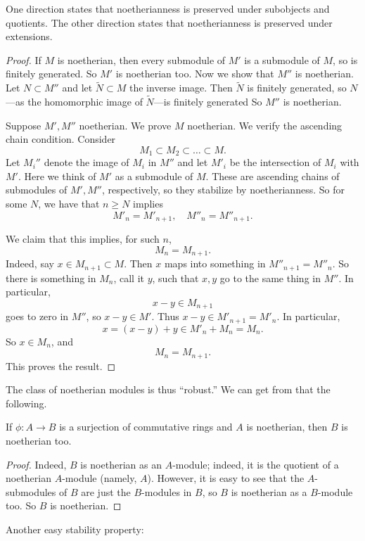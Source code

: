 One direction states that noetherianness is preserved under subobjects and
quotients. The other direction states that noetherianness is preserved under
extensions. 
\begin{proof} 
If $M$ is noetherian, then every submodule of $M'$ is a submodule of $M$, so is
finitely generated. So $M'$ is noetherian too. Now we show that $M''$ is
noetherian. Let $N \subset M''$ and let
$\widetilde{N} \subset M$ the inverse image. Then $\widetilde{N}$ is finitely generated, so
$N$---as the homomorphic image of $\widetilde{N}$---is finitely generated 
So $M''$ is noetherian.

Suppose $M', M''$ noetherian. We prove $M$ noetherian.
We verify the ascending chain condition. Consider
\[ M_1 \subset M_2 \subset \dots \subset M.  \]
Let $M_i''$ denote the image of $M_i$ in $M''$ and let $M'_i$ be the
intersection of $M_i$ with $M'$. Here we think of $M'$ as a submodule of $M$.
These are ascending chains of submodules of $M', M''$, respectively, so they
stabilize by noetherianness.
So for some $N$, we have
that $n \geq N$ implies 
\[ M'_n = M'_{n+1}, \quad M''_n = M''_{n+1}.  \]

We claim that this implies, for such $n$, 
\[ M_n = M_{n+1}.  \]
Indeed, say $x \in M_{n+1} \subset M$. Then $x$ maps into something in $M''_{n+1} = M''_n$.  
So there is something in $M_n$, call it $y$, such that $x,y$ go to the same
thing in $M''$. In particular, 
\[ x - y \in M_{n+1} \]
goes to zero in $M''$, so $x-y \in M'$. Thus $x-y \in M'_{n+1} = M'_n$. In
particular, 
\[ x = (x-y) + y \in M'_n + M_n = M_n.  \]
So $x \in M_n$, and 
\[ M_n = M_{n+1} . \]
This proves the result.
\end{proof} 

The class of noetherian modules is thus ``robust.'' We can get from that the
following.

\begin{proposition} 
If $\phi: A \to B$ is a surjection of commutative rings and $A$ is noetherian, then $B$ is
noetherian too.
\end{proposition} 
\begin{proof} 
Indeed, $B$ is noetherian as an $A$-module; indeed, it is the quotient of a
noetherian $A$-module (namely, $A$). However, it is easy to see that the
$A$-submodules of $B$ are just the $B$-modules in $B$, so $B$ is noetherian as a
$B$-module too. So $B$ is noetherian.  
\end{proof} 

Another easy stability property:

